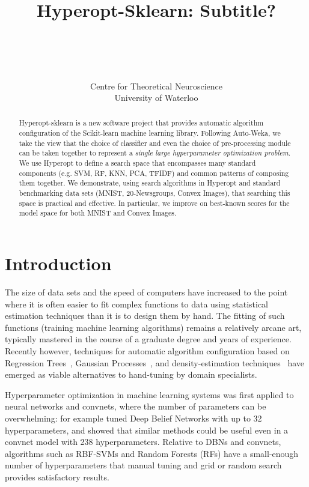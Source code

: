 \documentclass[wcp]{jmlr}
\title[Hyperopt-Sklearn]{Hyperopt-Sklearn: Subtitle?}
\author{
      \\
      \Name{Brent Komer} \Email{brent.komer@uwaterloo.ca}\\
      \Name{James Bergstra} \Email{james.bergstra@uwaterloo.ca}\\
      \Name{Chris Eliasmith} \Email{celiasmith@uwaterloo.ca}\\
      \addr Centre for Theoretical Neuroscience\\University of Waterloo\\
  }
\begin{document}
\maketitle

\begin{abstract}
    Hyperopt-sklearn is a new software project that provides automatic algorithm configuration of the Scikit-learn machine learning library.
    Following Auto-Weka, we take the view that the choice of classifier and even the choice of pre-processing module can be taken together to represent a {\em single large hyperparameter optimization problem}.
    We use Hyperopt to define a search space that encompasses many standard components (e.g. SVM, RF, KNN, PCA, TFIDF) and common patterns of composing them together.
    We demonstrate, using search algorithms in Hyperopt and standard benchmarking data sets (MNIST, 20-Newsgroups, Convex Images), that searching this space is practical and effective.
    In particular, we improve on best-known scores for the model space for both MNIST and Convex Images.
\end{abstract}

\section{Introduction}
\label{sec:intro}

The size of data sets and the speed of computers have increased to the point where it is often easier to fit complex functions to data using statistical estimation techniques than it is to design them by hand.
The fitting of such functions (training machine learning algorithms) remains a relatively arcane art, typically mastered in the course of a graduate degree and years of experience.
Recently however, techniques for automatic algorithm configuration based on
Regression Trees~\citep{hutter+hoos+leyton-brown:2011},
Gaussian Processes~\citep{MoTiZi78,snoek+larochelle+adams:2012nips},
and density-estimation techniques~\citep{bergstra+bardenet+bengio+kegl:2011}
have emerged as viable alternatives to hand-tuning by domain specialists.

Hyperparameter optimization in machine learning systems was first applied to neural networks and convnets, where the number of parameters can be overwhelming:
for example \citet{bergstra+bardenet+bengio+kegl:2011} tuned Deep Belief Networks with up to 32 hyperparameters,
and \citet{bergstra+yamins+cox:2013} showed that similar methods could be useful even in a convnet model with 238 hyperparameters.
Relative to DBNs and convnets, algorithms such as RBF-SVMs and Random Forests (RFs) have a small-enough number of hyperparameters that manual tuning and grid or random search provides satisfactory results.
\end{document}
